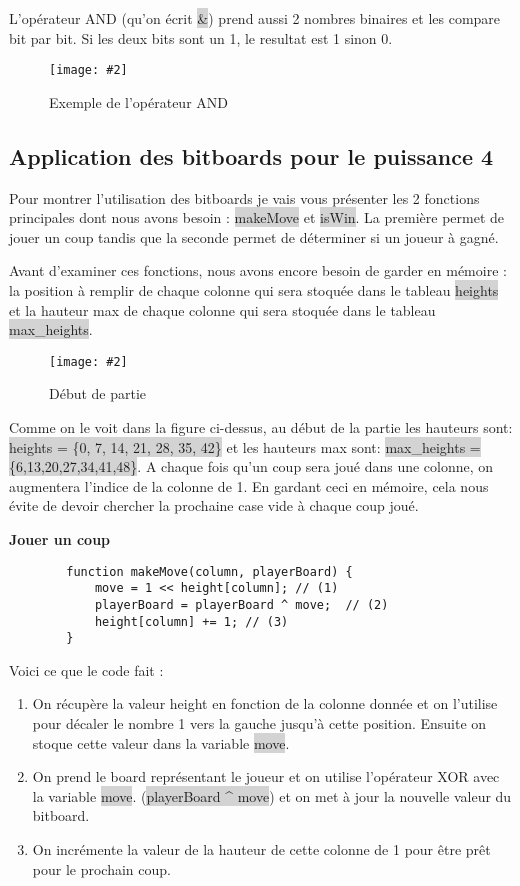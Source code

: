 \documentclass[a4paper]{article}
\newcommand{\img}[3][]{
    \begin{figure}[H]
        \centering
        \texttt{[image: \#2]}
        \caption{#1}    
    \end{figure}
}
\newcommand{\inlinecode}[1]{\colorbox{lightgray}{#1}}
\newcommand{\ptitle}[1]{\vspace{10pt}
{\large \textbf{#1}}}
\begin{document}
    L'opérateur AND (qu'on écrit \inlinecode{\&}) prend aussi 2 nombres binaires et les compare bit par bit. Si les deux bits sont un 1, le resultat est 1 sinon 0.
    \img[Exemple de l'opérateur AND]{Images/ANDExemple.png}{0.15}

\subsection{Application des bitboards pour le puissance 4}

    Pour montrer l'utilisation des bitboards je vais vous présenter les 2 fonctions principales dont nous avons besoin : \inlinecode{makeMove} et \inlinecode{isWin}. La première permet de jouer un coup tandis que la seconde permet de déterminer si un joueur à gagné.

    Avant d'examiner ces fonctions, nous avons encore besoin de garder en mémoire : la position à remplir de chaque colonne qui sera stoquée dans le tableau \inlinecode{heights} et la hauteur max de chaque colonne qui sera stoquée dans le tableau \inlinecode{max\_heights}.

    \img[Début de partie]{Images/EmptyBoard.png}{0.4}

    Comme on le voit dans la figure ci-dessus, au début de la partie les hauteurs sont: \newline\inlinecode{heights = \{0, 7, 14, 21, 28, 35, 42\}} et les hauteurs max sont: \inlinecode{max\_heights = \{6,13,20,27,34,41,48\}}. A chaque fois qu'un coup sera joué dans une colonne, on augmentera l'indice de la colonne de 1. En gardant ceci en mémoire, cela nous évite de devoir chercher la prochaine case vide à chaque coup joué.

    \ptitle{Jouer un coup}

    \begin{lstlisting}
        function makeMove(column, playerBoard) {
            move = 1 << height[column]; // (1)
            playerBoard = playerBoard ^ move;  // (2)
            height[column] += 1; // (3)
        }
    \end{lstlisting}

    Voici ce que le code fait : 
    \begin{enumerate}
        \item On récupère la valeur height en fonction de la colonne donnée et on l'utilise pour décaler le nombre 1 vers la gauche jusqu'à cette position. Ensuite on stoque cette valeur dans la variable \inlinecode{move}.
        \item On prend le board représentant le joueur et on utilise l'opérateur XOR avec la variable \inlinecode{move}. (\inlinecode{playerBoard \^{} move}) et on met à jour la nouvelle valeur du bitboard.
        \item On incrémente la valeur de la hauteur de cette colonne de 1 pour être prêt pour le prochain coup.
    \end{enumerate}
\end{document}
